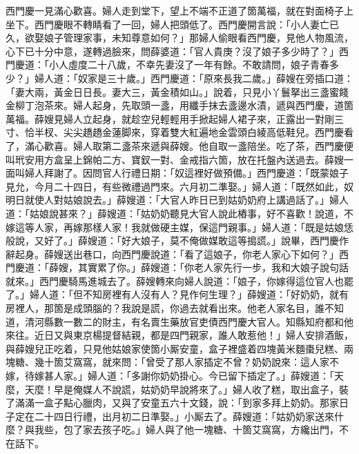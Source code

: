 西門慶一見滿心歡喜。婦人走到堂下，望上不端不正道了箇萬福，就在對面椅子上坐下。西門慶眼不轉睛看了一回，婦人把頭低了。西門慶開言說：「小人妻亡已久，欲娶娘子管理家事，未知尊意如何？」那婦人偷眼看西門慶，見他人物風流，心下已十分中意，遂轉過臉來，問薛婆道：「官人貴庚？沒了娘子多少時了？」西門慶道：「小人虛度二十八歲，不幸先妻沒了一年有餘。不敢請問，娘子青春多少？」婦人道：「奴家是三十歲。」西門慶道：「原來長我二歲。」薛嫂在旁插口道：「妻大兩，黃金日日長。妻大三，黃金積如山。」{}說着，只見小丫鬟拏出三盞蜜餞金柳丁泡茶來。婦人起身，先取頭一盞，用纖手抹去盞邊水漬，{}遞與西門慶，道箇萬福。薛嫂見婦人立起身，就趁空兒{}輕輕用手掀起婦人裙子來，正露出一對剛三寸、恰半杈、尖尖趫趫金蓮脚來，{}穿着雙大紅遍地金雲頭白綾高低鞋兒。{}西門慶看了，滿心歡喜。婦人取第二盞茶來遞與薛嫂。他自取一盞陪坐。吃了茶，西門慶便叫玳安用方盒呈上錦帕二方、寶釵一對、金戒指六箇，放在托盤內送過去。薛嫂一面叫婦人拜謝了。因問官人行禮日期：「奴這裡好做預備。」西門慶道：「既蒙娘子見允，今月二十四日，有些微禮過門來。六月初二準娶。」婦人道：「既然如此，奴明日就使人對姑娘說去。」薛嫂道：「大官人昨日已到姑奶奶府上講過話了。」婦人道：「姑娘說甚來？」薛嫂道：「姑奶奶聽見大官人說此樁事，好不喜歡！說道，不嫁這等人家，再嫁那樣人家！我就做硬主媒，保這門親事。」婦人道：「既是姑娘恁般說，又好了。」{}薛嫂道：「好大娘子，莫不俺做媒敢這等搗謊。」說畢，西門慶作辭起身。薛嫂送出巷口，向西門慶說道：「看了這娘子，你老人家心下如何？」西門慶道：「薛嫂，其實累了你。」{}薛嫂道：「你老人家先行一步，我和大娘子說句話就來。」西門慶騎馬進城去了。薛嫂轉來向婦人說道：「娘子，你嫁得這位官人也罷了。」婦人道：「但不知房裡有人沒有人？{}見作何生理？」薛嫂道：「好奶奶，就有房裡人，那箇是成頭腦的？我說是謊，你過去就看出來。{}他老人家名目，誰不知道，清河縣數一數二的財主，有名賣生藥放官吏債西門慶大官人。知縣知府都和他來往。近日又與東京楊提督結親，都是四門親家，誰人敢惹他！」婦人安排酒飯，與薛嫂兒正吃着，只見他姑娘家使箇小厮安童，盒子裡盛着四塊黃米麵棗兒糕、兩塊糖、幾十箇艾窩窩，就來問：「曾受了那人家插定不曾？奶奶說來：這人家不嫁，待嫁甚人家。」婦人道：「多謝你奶奶掛心。今已留下插定了。」薛嫂道：「天麼，天麼！早是俺媒人不說謊，姑奶奶早說將來了。」{}婦人收了糕，取出盒子，裝了滿滿一盒子點心臘肉，又與了安童五六十文錢，說：「到家多拜上奶奶。那家日子定在二十四日行禮，出月初二日準娶。」小厮去了。薛嫂道：「姑奶奶家送來什麼？與我些，包了家去孩子吃。」婦人與了他一塊糖、十箇艾窩窩，方纔出門，不在話下。


